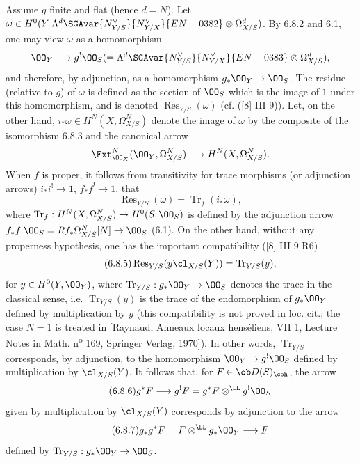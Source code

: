 Assume $g$ finite and flat (hence $d=N$). Let $\omega\in H^0(Y,\Lambda^d \SGAvar{N_{Y/S}^{\vee}}{N_{Y/X}^{\vee}}{EN-0382}\otimes\Omega^d_{X/S})$. By 6.8.2 and 6.1, one may view $\omega$ as a homomorphism
\[
\OO_Y\longrightarrow g^!\OO_S(=\Lambda^d \SGAvar{N_{Y/S}^{\vee}}{N_{Y/X}^{\vee}}{EN-0383}\otimes\Omega^d_{X/S}),
\]
and therefore, by adjunction, as a homomorphism $g_*\OO_Y\to\OO_S$. The residue (relative to $g$) of $\omega$ is defined as the section of $\OO_S$ which is the image of $1$ under this homomorphism, and is denoted $\operatorname{Res}_{Y/S}(\omega)$ (cf. ([8] III 9)). Let, on the other hand, $i_*\omega\in H^N(X,\Omega^N_{X/S})$ denote the image of $\omega$ by the composite of the isomorphism 6.8.3 and the canonical arrow
\[
\Ext^N_{\OO_X}(\OO_Y,\Omega^N_{X/S})\longrightarrow H^N(X,\Omega^N_{X/S}).
\]
When $f$ is proper, it follows from transitivity for trace morphisms (or adjunction arrows) $i_*i^!\to 1$, $f_*f^!\to 1$, that
\begin{equation}
\tag{6.8.4}
\operatorname{Res}_{Y/S}(\omega)=\operatorname{Tr}_f(i_*\omega),
\end{equation}
where $\operatorname{Tr}_f:H^N(X,\Omega^N_{X/S})\to H^0(S,\OO_S)$ is defined by the adjunction arrow $f_*f^!\OO_S=Rf_*\Omega^N_{X/S}[N]\to\OO_S$ (6.1). On the other hand, without any properness hypothesis, one has the important compatibility ([8] III 9 R6)
\begin{equation}
\tag{6.8.5}
\operatorname{Res}_{Y/S}(y\cl_{X/S}(Y))=\operatorname{Tr}_{Y/S}(y),
\end{equation}
for $y\in H^0(Y,\OO_Y)$, where $\operatorname{Tr}_{Y/S}:g_*\OO_Y\to\OO_S$ denotes the trace in the classical sense, i.e. $\operatorname{Tr}_{Y/S}(y)$ is the trace of the endomorphism of $g_*\OO_Y$ defined by multiplication by $y$ (this compatibility is not proved in loc. cit.; the case $N=1$ is treated in [Raynaud, Anneaux locaux henséliens, VII 1, Lecture Notes in Math. n\textsuperscript{o} 169, Springer Verlag, 1970]). In other words, $\operatorname{Tr}_{Y/S}$ corresponds, by adjunction, to the homomorphism $\OO_Y\to g^!\OO_S$ defined by multiplication by $\cl_{X/S}(Y)$. It follows that, for $F\in\ob D(S)_{\coh}$, the arrow
\begin{equation}
\tag{6.8.6}
g^*F\longrightarrow g^!F=g^*F\otimes^{\LL}g^!\OO_S
\end{equation}
given by multiplication by $\cl_{X/S}(Y)$ corresponds by adjunction to the arrow
\begin{equation}
\tag{6.8.7}
g_*g^*F=F\otimes^{\LL}g_*\OO_Y\longrightarrow F
\end{equation}
defined by $\operatorname{Tr}_{Y/S}:g_*\OO_Y\to\OO_S$.


